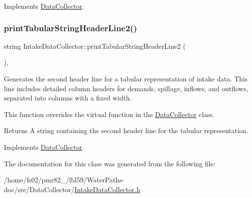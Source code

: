 Implements \mbox{\hyperlink{classDataCollector_a91619cfa9e9b8cefd2f7c20d5718b41e}{Data\+Collector}}.

\mbox{\label{classIntakeDataCollector_a2855eb8eed71649309bd4d9336f258c0}} 
\subsubsection{\texorpdfstring{print\+Tabular\+String\+Header\+Line2()}{printTabularStringHeaderLine2()}}
{\footnotesize\ttfamily string Intake\+Data\+Collector\+::print\+Tabular\+String\+Header\+Line2 (\begin{DoxyParamCaption}{ }\end{DoxyParamCaption})\hspace{0.3cm}{\ttfamily [override]}, {\ttfamily [virtual]}}



Generates the second header line for a tabular representation of intake data. This line includes detailed column headers for demands, spillage, inflows, and outflows, separated into columns with a fixed width. 

This function overrides the virtual function in the \mbox{\hyperlink{classDataCollector}{Data\+Collector}} class.

\begin{DoxyReturn}{Returns}
A string containing the second header line for the tabular representation. 
\end{DoxyReturn}


Implements \mbox{\hyperlink{classDataCollector_af01ea961314be2164f39e6d4cd59e443}{Data\+Collector}}.



The documentation for this class was generated from the following file\+:\begin{DoxyCompactItemize}
\item 
/home/fs02/pmr82\+\_/lbl59/\+Water\+Paths-\/doc/src/\+Data\+Collector/\mbox{\hyperlink{IntakeDataCollector_8h}{Intake\+Data\+Collector.\+h}}\end{DoxyCompactItemize}
